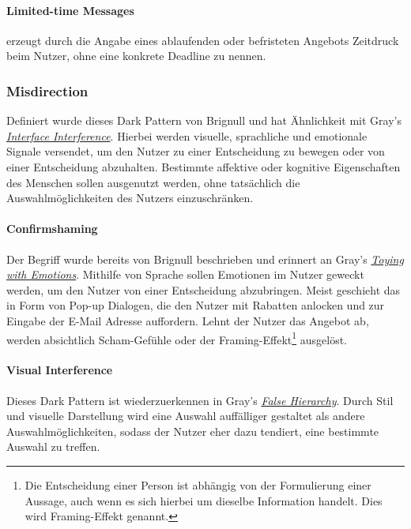 \documentclass[a4paper]{article}
\begin{document}
\paragraph{Limited-time Messages}
\label{para:limited_time_message}
erzeugt durch die Angabe eines ablaufenden oder befristeten Angebots Zeitdruck beim Nutzer, ohne eine konkrete Deadline zu nennen.

\subsubsection{Misdirection}
\label{sssec:misdirection}
Definiert wurde dieses Dark Pattern von Brignull und hat Ähnlichkeit mit Gray's \hyperref[sssec:interface_interference]{\textit{Interface Interference}}.
Hierbei werden visuelle, sprachliche und emotionale Signale versendet, um den Nutzer zu einer Entscheidung zu bewegen oder von einer Entscheidung abzuhalten. Bestimmte affektive oder kognitive Eigenschaften des Menschen sollen ausgenutzt werden, ohne tatsächlich die Auswahlmöglichkeiten des Nutzers einzuschränken.

\paragraph{Confirmshaming}
\label{para:confirmshaming}
Der Begriff wurde bereits von Brignull beschrieben und erinnert an Gray's \hyperref[subpara:toying_with_emotions]{\textit{Toying with Emotions}}.\newline
Mithilfe von Sprache sollen Emotionen im Nutzer geweckt werden, um den Nutzer von einer Entscheidung abzubringen. Meist geschieht das in Form von Pop-up Dialogen, die den Nutzer mit Rabatten anlocken und zur Eingabe der E-Mail Adresse auffordern. Lehnt der Nutzer das Angebot ab, werden absichtlich Scham-Gefühle oder der Framing-Effekt\footnote{\label{foot:5} Die Entscheidung einer Person ist abhängig von der Formulierung einer Aussage, auch wenn es sich hierbei um dieselbe Information handelt. Dies wird Framing-Effekt genannt.}  ausgelöst.

\paragraph{Visual Interference}
\label{para:visual_interference}
Dieses Dark Pattern ist wiederzuerkennen in Gray's \hyperref[subpara:false_hierarchy]{\textit{False Hierarchy}}. 
Durch Stil und visuelle Darstellung wird eine Auswahl auffälliger gestaltet als andere Auswahlmöglichkeiten, sodass der Nutzer eher dazu tendiert, eine bestimmte Auswahl zu treffen.
\end{document}
